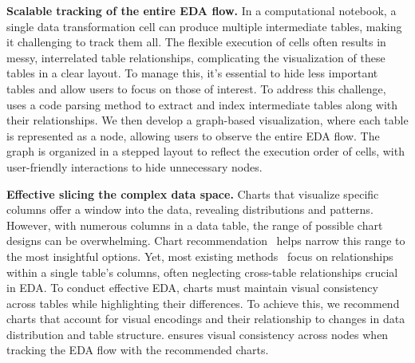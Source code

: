 \textbf{Scalable tracking of the entire EDA flow.}
In a computational notebook, a single data transformation cell can produce multiple intermediate tables, making it challenging to track them all. The flexible execution of cells often results in messy, interrelated table relationships, complicating the visualization of these tables in a clear layout. To manage this, it's essential to hide less important tables and allow users to focus on those of interest.
To address this challenge, \system{} uses a code parsing method to extract and index intermediate tables along with their relationships. We then develop a graph-based visualization, where each table is represented as a node, allowing users to observe the entire EDA flow. The graph is organized in a stepped layout to reflect the execution order of cells, with user-friendly interactions to hide unnecessary nodes.

\textbf{Effective slicing the complex data space.} 
Charts that visualize specific columns offer a window into the data, revealing distributions and patterns. However, with numerous columns in a data table, the range of possible chart designs can be overwhelming. Chart recommendation~\cite{saket2018heuristics} helps narrow this range to the most insightful options. Yet, most existing methods~\cite{lee2021lux, epperson2022leveraging} focus on relationships within a single table's columns, often neglecting cross-table relationships crucial in EDA.
To conduct effective EDA, charts must maintain visual consistency across tables while highlighting their differences. To achieve this, we recommend charts that account for visual encodings and their relationship to changes in data distribution and table structure. \system{} ensures visual consistency across nodes when tracking the EDA flow with the recommended charts.



